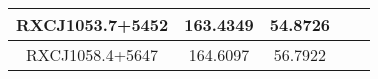 \documentclass[12pt]{article}
\begin{document}
\begin{center}
\begin{tabular}{|c|c|c|c|c|}
RXCJ1053.7+5452 & 163.4349 & 54.8726 & &\\ \hline  %
RXCJ1058.4+5647 & 164.6097 & 56.7922 & &\\ \hline  %
\hline
\end{tabular}
\end{center}

%

\end{document}
